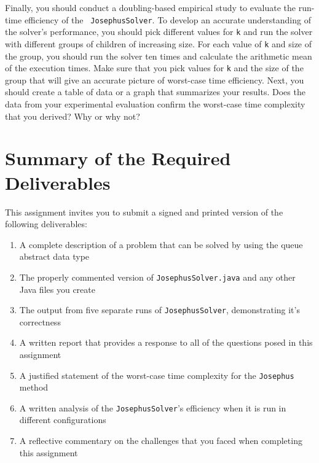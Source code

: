   Finally, you should conduct a doubling-based empirical study to evaluate the run-time efficiency of the {\tt
  JosephusSolver}.  To develop an accurate understanding of the solver's performance, you should pick different values
  for {\tt k} and run the solver with different groups of children of increasing size. For each value of {\tt k} and
  size of the group, you should run the solver ten times and calculate the arithmetic mean of the execution times. Make
  sure that you pick values for {\tt k} and the size of the group that will give an accurate picture of worst-case time
  efficiency. Next, you should create a table of data or a graph that summarizes your results. Does the data from your
  experimental evaluation confirm the worst-case time complexity that you derived? Why or why not?

\section*{Summary of the Required Deliverables}

  This assignment invites you to submit a signed and printed version of the following deliverables:

  \begin{enumerate}

  \item A complete description of a problem that can be solved by using the queue abstract data type

  \item The properly commented version of {\tt JosephusSolver.java} and any other Java files you create

  \item The output from five separate runs of {\tt JosephusSolver}, demonstrating it's correctness

  \item A written report that provides a response to all of the questions posed in this assignment

  \item A justified statement of the worst-case time complexity for the {\tt Josephus} method

  \item A written analysis of the {\tt JosephusSolver}'s efficiency when it is run in different configurations

  \item A reflective commentary on the challenges that you faced when completing this assignment

  \end{enumerate}

